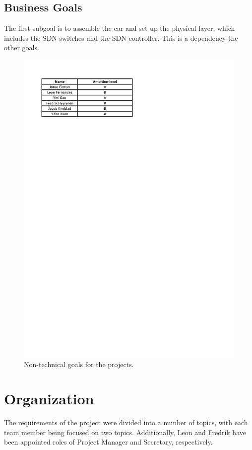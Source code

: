 \documentclass[11pt, titlepage]{article} %
\begin{document}
\subsection{Business Goals}
The first subgoal is to assemble the car and set up the physical layer,
which includes the SDN-switches and the SDN-controller. This is a
dependency the other goals. 
\begin{figure}
    \centering
    \includegraphics[scale=0.6]{goals_bs.pdf}
    \caption{Non-technical goals for the projects.}
    \label{fig:goals_bs}
\end{figure}
\section{Organization}
The requirements of the project were divided into a number of topics,
with each team member being focused on two topics. Additionally, Leon and
Fredrik have been appointed roles of Project Manager and Secretary,
respectively.
\end{document}
